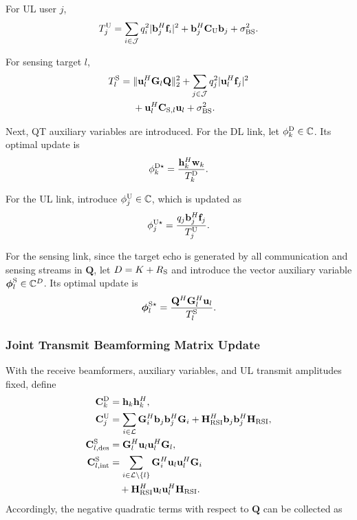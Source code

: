 \documentclass[letterpaper,journal]{IEEEtran}
\begin{document}
For UL user $j$,
\begin{equation}
T_j^{\rm U}
=
\sum_{i\in\mathcal J}
q_i^2|\mathbf b_j^H\mathbf f_i|^2
+
\mathbf b_j^H\mathbf C_{\rm U}\mathbf b_j
+
\sigma_{\rm BS}^2.
\label{eq:total_power_ul}
\end{equation}

For sensing target $l$,
\begin{equation}
\begin{aligned}
T_l^{\rm S}
={}&
\|\mathbf u_l^H\mathbf G_l\mathbf Q\|_2^2
+
\sum_{j\in\mathcal J}
q_j^2|\mathbf u_l^H\mathbf f_j|^2\\
&+
\mathbf u_l^H\mathbf C_{{\rm S},l}\mathbf u_l
+
\sigma_{\rm BS}^2.
\end{aligned}
\label{eq:total_power_sensing}
\end{equation}

Next, QT auxiliary variables are introduced. For the DL link, let $\phi_k^{\rm D}\in\mathbb C$. Its optimal update is
\begin{equation}
\phi_k^{{\rm D}\star}
=
\frac{
\mathbf h_k^H\mathbf w_k
}{
T_k^{\rm D}
}.
\label{eq:qt_dl_update}
\end{equation}

For the UL link, introduce $\phi_j^{\rm U}\in\mathbb C$, which is updated as
\begin{equation}
\phi_j^{{\rm U}\star}
=
\frac{
q_j\mathbf b_j^H\mathbf f_j
}{
T_j^{\rm U}
}.
\label{eq:qt_ul_update}
\end{equation}

For the sensing link, since the target echo is generated by all communication and sensing streams in $\mathbf Q$, let $D=K+R_{\rm S}$ and introduce the vector auxiliary variable $\boldsymbol\phi_l^{\rm S}\in\mathbb C^D$. Its optimal update is
\begin{equation}
\boldsymbol\phi_l^{{\rm S}\star}
=
\frac{
\mathbf Q^H\mathbf G_l^H\mathbf u_l
}{
T_l^{\rm S}
}.
\label{eq:qt_sensing_update}
\end{equation}

\subsubsection{Joint Transmit Beamforming Matrix Update}

With the receive beamformers, auxiliary variables, and UL
transmit amplitudes fixed, define
\[
\begin{aligned}
\mathbf C_k^{\rm D}
&= \mathbf h_k\mathbf h_k^H,\\
\mathbf C_j^{\rm U}
&=
\sum_{i\in\mathcal L}
\mathbf G_i^H\mathbf b_j\mathbf b_j^H\mathbf G_i
+
\mathbf H_{\rm RSI}^H
\mathbf b_j\mathbf b_j^H
\mathbf H_{\rm RSI},\\
\mathbf C_{l,{\rm des}}^{\rm S}
&=
\mathbf G_l^H
\mathbf u_l\mathbf u_l^H
\mathbf G_l,\\
\mathbf C_{l,{\rm int}}^{\rm S}
&=
\sum_{i\in\mathcal L\setminus\{l\}}
\mathbf G_i^H
\mathbf u_l\mathbf u_l^H
\mathbf G_i\\
&\quad+
\mathbf H_{\rm RSI}^H
\mathbf u_l\mathbf u_l^H
\mathbf H_{\rm RSI}.
\end{aligned}
\]
Accordingly, the negative quadratic terms with respect to
$\mathbf Q$ can be collected as
\end{document}

